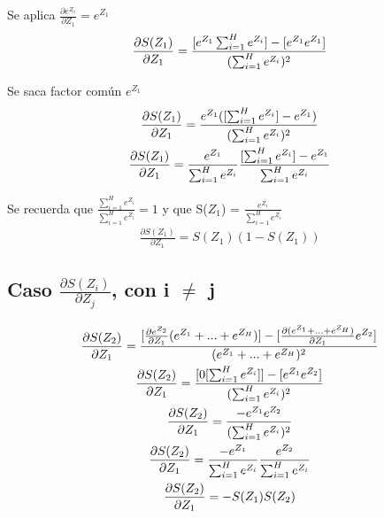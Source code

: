 Se aplica $\frac{\partial e^{Z_1}}{\partial Z_1} = e^{Z_1}$ \\
\begin{gather}
	\frac{\partial S(Z_1)}{\partial Z_1} = \frac{[e^{Z_1}   \sum_{i=1}^{H}  e^{Z_i}] - [e^{Z_1}   e^{Z_1}]   }{ (\sum_{i=1}^{H}  e^{Z_i})^2} \notag \\
\end{gather}

Se saca factor común $e^{Z_1}$ \\
\begin{gather}
	\frac{\partial S(Z_1)}{\partial Z_1} = \frac{e^{Z_1} ([\sum_{i=1}^{H}  e^{Z_i}] - e^{Z_1})  }{(\sum_{i=1}^{H}  e^{Z_i})^2} \notag \\
	\frac{\partial S(Z_1)}{\partial Z_1} = \frac{e^{Z_1}}{\sum_{i=1}^{H}  e^{Z_i}}   \frac{[\sum_{i=1}^{H}  e^{Z_i}] - e^{Z_1}}{\sum_{i=1}^{H}  e^{Z_i}} \notag
\end{gather}

Se recuerda que $\frac{\sum_{i=1}^{H}  e^{Z_i}}{\sum_{i=1}^{H}  e^{Z_i}} = 1$ y que S($Z_1$) = $ \frac{e^{Z_1}}{\sum_{i=1}^{H}  e^{Z_i}}$ \\
\begin{gather}
	\frac{\partial S(Z_1)}{\partial Z_1} = S(Z_1)   (1- S(Z_1))
	\label{grad_Oi_Zk_drch}
\end{gather}

\subsection{Caso $\frac{\partial S(Z_i)}{\partial Z_j}$, con i $\neq$ j}

\begin{gather}
	\frac{\partial S(Z_2)}{\partial Z_1} = \frac{[\frac{\partial e^{Z_2}}{\partial Z_1}   (e^{Z_1} + ... + e^{Z_H}) ] - [\frac{\partial (e^{Z_1} + ... + e^{Z_H})}{\partial Z_1}   e^{Z_2} ] }{(e^{Z_1} + ... + e^{Z_H})^2} \notag \\
	\frac{\partial S(Z_2)}{\partial Z_1} = \frac{[0   [\sum_{i=1}^{H}  e^{Z_i}]] - [e^{Z_1}   e^{Z_2}]   }{ (\sum_{i=1}^{H}  e^{Z_i})^2} \notag \\
	\frac{\partial S(Z_2)}{\partial Z_1} = \frac{-e^{Z_1}   e^{Z_2}  }{(\sum_{i=1}^{H}  e^{Z_i})^2} \notag \\
	\frac{\partial S(Z_2)}{\partial Z_1} = \frac{-e^{Z_1}}{\sum_{i=1}^{H}  e^{Z_i}}   \frac{e^{Z_2}}{\sum_{i=1}^{H}  e^{Z_i}} \notag \\
	\frac{\partial S(Z_2)}{\partial Z_1} = -S(Z_1)   S(Z_2)
	\label{grad_Oi_Zk_izq}
\end{gather}

